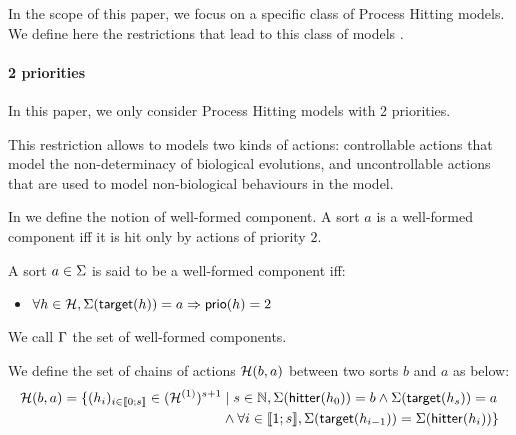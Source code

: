 
In the scope of this paper, we focus on a specific class of Process Hitting models.
We define here the restrictions that lead to this class of models .

\paragraph{2 priorities}
In this paper, we only consider Process Hitting models with 2 priorities.

This restriction allows to models two kinds of actions: controllable actions that model the non-determinacy of biological evolutions,
and uncontrollable actions that are used to model non-biological behaviours in the model.

In  we define the notion of well-formed component.
A sort $a$ is a well-formed component iff
it is hit only by actions of priority $2$.
\begin{definition}
\label{def:component}
  A sort $a \in \Sigma$ is said to be a well-formed component iff:
  \begin{itemize}
    \item $\forall h \in \mathcal{H}, \Sigma(\mathsf{target}(h)) = a \Rightarrow \mathsf{prio}(h) = 2$
  \end{itemize}
\end{definition}
We call $\Gamma$ the set of well-formed components.

\begin{definition}
\label{def:chainsactions}
  We define the set of chains of actions $\mathcal{H}(b, a)$ between two sorts $b$ and $a$ as below:
  \begin{align*}
  \mathcal{H}(b, a) = \{ (h_i)_{i \in \llbracket 0; s \rrbracket} \in (\mathcal{H}^{(1)})^{s+1} &\mid s \in \mathbb{N}, \Sigma(\mathsf{hitter}(h_0)) = b \wedge \Sigma(\mathsf{target}(h_s)) = a \\
    & \wedge \forall i \in \llbracket 1; s \rrbracket, \Sigma(\mathsf{target}(h_{i-1})) = \Sigma(\mathsf{hitter}(h_{i})) \}
  \end{align*}
\end{definition}

